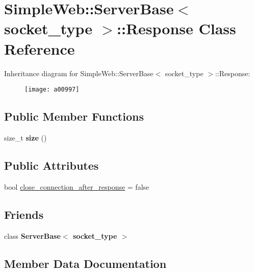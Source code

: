 \hypertarget{a00997}{}\section{Simple\+Web\+:\+:Server\+Base$<$ socket\+\_\+type $>$\+:\+:Response Class Reference}
\label{a00997}
Inheritance diagram for Simple\+Web\+:\+:Server\+Base$<$ socket\+\_\+type $>$\+:\+:Response\+:\begin{figure}[H]
\begin{center}
\leavevmode
\texttt{[image: a00997]}
\end{center}
\end{figure}
\subsection*{Public Member Functions}
\begin{DoxyCompactItemize}
\item 
\mbox{\label{a00997_af666efb61621d70c16e3d6a6c419271d}} 
size\+\_\+t {\bfseries size} ()
\end{DoxyCompactItemize}
\subsection*{Public Attributes}
\begin{DoxyCompactItemize}
\item 
bool \hyperlink{a00997_a2818b4f3c577ff1f4067bb1c62640c15}{close\+\_\+connection\+\_\+after\+\_\+response} = false
\end{DoxyCompactItemize}
\subsection*{Friends}
\begin{DoxyCompactItemize}
\item 
\mbox{\label{a00997_a01d54a7e16ca437c98ec571deca98dfc}} 
class {\bfseries Server\+Base$<$ socket\+\_\+type $>$}
\end{DoxyCompactItemize}


\subsection{Member Data Documentation}
\mbox{\label{a00997_a2818b4f3c577ff1f4067bb1c62640c15}} 
